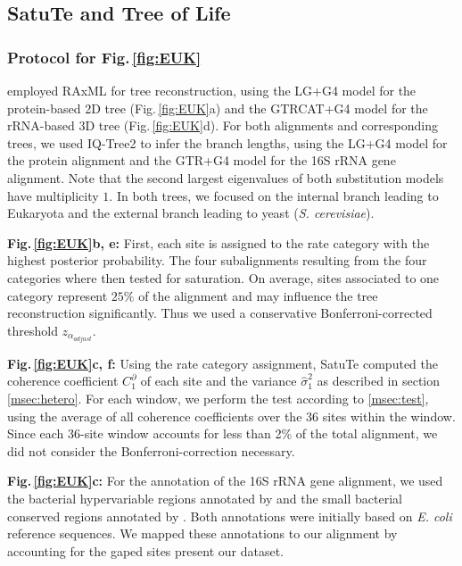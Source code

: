 \bigskip


\subsection{SatuTe and Tree of Life}\label{msec:ToL}

\subsubsection*{Protocol for Fig.\,\ref{fig:EUK}}
\label{msec:protocol_sliding_window_analysis}

  employed RAxML for tree reconstruction, using the LG+G4 model for the protein-based 2D tree (Fig.\,\ref{fig:EUK}a) and the GTRCAT+G4 model for the rRNA-based 3D tree (Fig.\,\ref{fig:EUK}d). For both alignments and corresponding trees, we  used IQ-Tree2 to infer the branch lengths, using the LG+G4 model for the protein alignment and the GTR+G4 model for the 16S rRNA gene alignment. Note that the second largest eigenvalues of both substitution models have multiplicity $1$.  In both trees, we focused on the internal branch leading to Eukaryota and the external branch leading to yeast (\textit{S. cerevisiae}).

\medskip
\noindent \textbf{Fig.\,\ref{fig:EUK}b, e:}
First,  each site is assigned to the rate category with the highest posterior probability. The four subalignments resulting from the four categories where then tested for saturation. On average, sites associated to one category represent $25\%$ of the alignment and may influence the tree reconstruction significantly. Thus we used a conservative Bonferroni-corrected threshold $z_{\alpha_{adjust}}$. 

\medskip
\noindent \textbf{Fig.\,\ref{fig:EUK}c, f:}
Using the rate category assignment, SatuTe computed the coherence coefficient $C^\partial_1$ of each site and the variance $\hat\sigma_1^2$ as described in section \ref{msec:hetero}. For each window, we perform the test according to \ref{msec:test}, using the  average of all coherence coefficients  over the 36 sites within the window. Since each 36-site window accounts for less than 2\% of the total alignment, we did not consider the Bonferroni-correction necessary. %

\medskip
\noindent \textbf{Fig.\,\ref{fig:EUK}c:}
For the annotation of the 16S rRNA gene alignment, we used the bacterial hypervariable regions annotated by  and the small bacterial conserved regions annotated by . Both annotations were initially based on \textit{E. coli} reference sequences. We mapped these annotations to our alignment by accounting for the gaped sites present our dataset.



